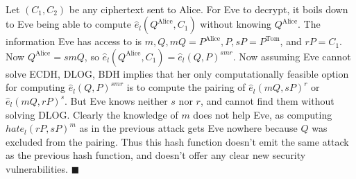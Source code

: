 \documentclass[letterpaper,12pt,oneside,onecolumn]{article}
\begin{document}
\paragraph{}
Let $(C_1, C_2)$ be any ciphertext sent to Alice. For Eve to decrypt, it boils down to Eve being able to compute $\hat{e}_l(Q^\text{Alice}, C_1)$ without knowing $Q^\text{Alice}$. The information Eve has access to is $m, Q, mQ = P^\text{Alice}, P, sP=P^\text{Tom}$, and $rP = C_1$. Now $Q^\text{Alice} = smQ$, so $\hat{e}_l(Q^\text{Alice}, C_1) = \hat{e}_l(Q, P)^{smr}$. Now assuming Eve cannot solve ECDH, DLOG, BDH implies that her only computationally feasible option for computing $\hat{e}_l(Q,P)^{smr}$ is to compute the pairing of $\hat{e}_l(mQ, sP)^r$ or $\hat{e}_l(mQ, rP)^s$. But Eve knows neither $s$ nor $r$, and cannot find them without solving DLOG. Clearly the knowledge of $m$ does not help Eve, as computing $hat{e}_l(rP, sP)^m$ as in the previous attack gets Eve nowhere because $Q$ was excluded from the pairing. Thus this hash function doesn't emit the same attack as the previous hash function, and doesn't offer any clear new security vulnerabilities. $\blacksquare$
\end{document}
